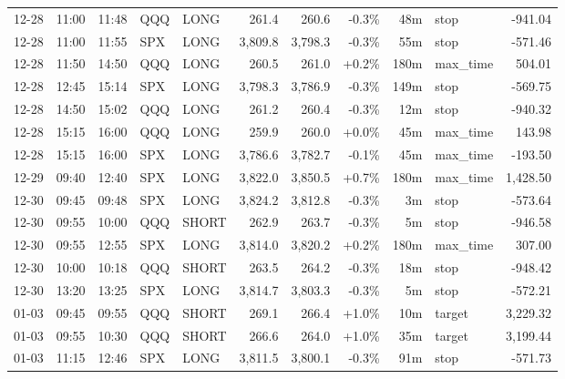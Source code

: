 \documentclass[11pt,a4paper,twoside]{article}
\begin{document}
\begin{center}
\begin{longtable}{>{\color{txtmain}}l l l l l r r r r >{\color{txtmain}}l r}
12-28 & 11:00 & 11:48 & QQQ & LONG & 261.4 & 260.6 & \textcolor{lossred}{-0.3\%} & 48m & stop & \textcolor{lossred}{-941.04} \\
12-28 & 11:00 & 11:55 & SPX & LONG & 3,809.8 & 3,798.3 & \textcolor{lossred}{-0.3\%} & 55m & stop & \textcolor{lossred}{-571.46} \\
12-28 & 11:50 & 14:50 & QQQ & LONG & 260.5 & 261.0 & \textcolor{wingreen}{+0.2\%} & 180m & max\_time & \textcolor{wingreen}{504.01} \\
12-28 & 12:45 & 15:14 & SPX & LONG & 3,798.3 & 3,786.9 & \textcolor{lossred}{-0.3\%} & 149m & stop & \textcolor{lossred}{-569.75} \\
12-28 & 14:50 & 15:02 & QQQ & LONG & 261.2 & 260.4 & \textcolor{lossred}{-0.3\%} & 12m & stop & \textcolor{lossred}{-940.32} \\
12-28 & 15:15 & 16:00 & QQQ & LONG & 259.9 & 260.0 & \textcolor{wingreen}{+0.0\%} & 45m & max\_time & \textcolor{wingreen}{143.98} \\
12-28 & 15:15 & 16:00 & SPX & LONG & 3,786.6 & 3,782.7 & \textcolor{lossred}{-0.1\%} & 45m & max\_time & \textcolor{lossred}{-193.50} \\
12-29 & 09:40 & 12:40 & SPX & LONG & 3,822.0 & 3,850.5 & \textcolor{wingreen}{+0.7\%} & 180m & max\_time & \textcolor{wingreen}{1,428.50} \\
12-30 & 09:45 & 09:48 & SPX & LONG & 3,824.2 & 3,812.8 & \textcolor{lossred}{-0.3\%} & 3m & stop & \textcolor{lossred}{-573.64} \\
12-30 & 09:55 & 10:00 & QQQ & SHORT & 262.9 & 263.7 & \textcolor{lossred}{-0.3\%} & 5m & stop & \textcolor{lossred}{-946.58} \\
12-30 & 09:55 & 12:55 & SPX & LONG & 3,814.0 & 3,820.2 & \textcolor{wingreen}{+0.2\%} & 180m & max\_time & \textcolor{wingreen}{307.00} \\
12-30 & 10:00 & 10:18 & QQQ & SHORT & 263.5 & 264.2 & \textcolor{lossred}{-0.3\%} & 18m & stop & \textcolor{lossred}{-948.42} \\
12-30 & 13:20 & 13:25 & SPX & LONG & 3,814.7 & 3,803.3 & \textcolor{lossred}{-0.3\%} & 5m & stop & \textcolor{lossred}{-572.21} \\
01-03 & 09:45 & 09:55 & QQQ & SHORT & 269.1 & 266.4 & \textcolor{wingreen}{+1.0\%} & 10m & target & \textcolor{wingreen}{3,229.32} \\
01-03 & 09:55 & 10:30 & QQQ & SHORT & 266.6 & 264.0 & \textcolor{wingreen}{+1.0\%} & 35m & target & \textcolor{wingreen}{3,199.44} \\
01-03 & 11:15 & 12:46 & SPX & LONG & 3,811.5 & 3,800.1 & \textcolor{lossred}{-0.3\%} & 91m & stop & \textcolor{lossred}{-571.73} \\

\end{longtable}
\end{center}
\end{document}
